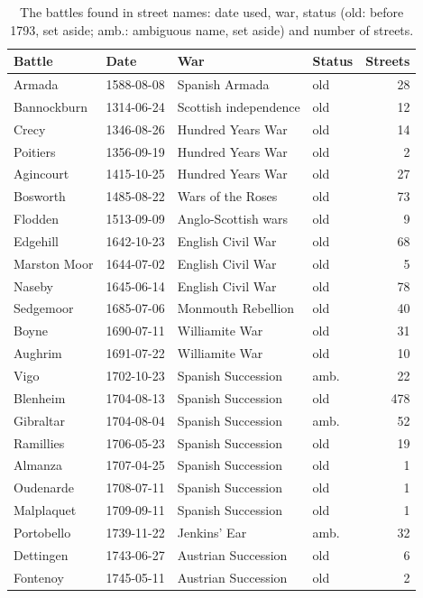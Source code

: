 \documentclass[11pt,a4paper]{article}
\begin{document}
\begin{small}\begin{longtable}{llp{5.2cm}lr}\caption{The battles found in street names: date used, war, status (old: before 1793, set aside; amb.: ambiguous name, set aside) and number of streets.}\label{tab:battles}\\\toprule Battle & Date & War & Status & Streets\\\midrule\endhead
Armada & 1588-08-08 & Spanish Armada & old & 28\\
Bannockburn & 1314-06-24 & Scottish independence & old & 12\\
Crecy & 1346-08-26 & Hundred Years War & old & 14\\
Poitiers & 1356-09-19 & Hundred Years War & old & 2\\
Agincourt & 1415-10-25 & Hundred Years War & old & 27\\
Bosworth & 1485-08-22 & Wars of the Roses & old & 73\\
Flodden & 1513-09-09 & Anglo-Scottish wars & old & 9\\
Edgehill & 1642-10-23 & English Civil War & old & 68\\
Marston Moor & 1644-07-02 & English Civil War & old & 5\\
Naseby & 1645-06-14 & English Civil War & old & 78\\
Sedgemoor & 1685-07-06 & Monmouth Rebellion & old & 40\\
Boyne & 1690-07-11 & Williamite War & old & 31\\
Aughrim & 1691-07-22 & Williamite War & old & 10\\
Vigo & 1702-10-23 & Spanish Succession & amb. & 22\\
Blenheim & 1704-08-13 & Spanish Succession & old & 478\\
Gibraltar & 1704-08-04 & Spanish Succession & amb. & 52\\
Ramillies & 1706-05-23 & Spanish Succession & old & 19\\
Almanza & 1707-04-25 & Spanish Succession & old & 1\\
Oudenarde & 1708-07-11 & Spanish Succession & old & 1\\
Malplaquet & 1709-09-11 & Spanish Succession & old & 1\\
Portobello & 1739-11-22 & Jenkins' Ear & amb. & 32\\
Dettingen & 1743-06-27 & Austrian Succession & old & 6\\
Fontenoy & 1745-05-11 & Austrian Succession & old & 2\\

\end{longtable}
\end{small}
\end{document}
